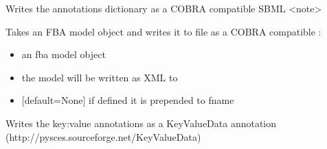 \documentclass[letterpaper,10pt,english]{sphinxmanual}
\begin{document}

\begin{fulllineitems}
\label{\detokenize{modules_doc:cbmpy.CBXML.sbml_writeAnnotationsAsCOBRANote}}
\pysigstartsignatures
{}
\pysigstopsignatures
\sphinxAtStartPar
Writes the annotations dictionary as a COBRA compatible SBML \textless{}note\textgreater{}

\end{fulllineitems}


\begin{fulllineitems}
\label{\detokenize{modules_doc:cbmpy.CBXML.sbml_writeCOBRASBML}}
\pysigstartsignatures
{}
\pysigstopsignatures
\sphinxAtStartPar
Takes an FBA model object and writes it to file as a COBRA compatible :
\begin{itemize}
\item {} 
\sphinxAtStartPar
{} an fba model object

\item {} 
\sphinxAtStartPar
{} the model will be written as XML to 

\item {} 
\sphinxAtStartPar
{} {[}default=None{]} if defined it is prepended to fname

\end{itemize}

\end{fulllineitems}


\begin{fulllineitems}
\label{\detokenize{modules_doc:cbmpy.CBXML.sbml_writeKeyValueDataAnnotation}}
\pysigstartsignatures
{}
\pysigstopsignatures
\sphinxAtStartPar
Writes the key:value annotations as a KeyValueData annotation (http://pysces.sourceforge.net/KeyValueData)

\end{fulllineitems}
\end{document}
